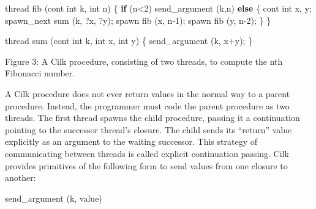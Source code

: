 \documentclass[
]{article}
\newenvironment{Shaded}{}{}
\newcommand{\ControlFlowTok}[1]{\textcolor[rgb]{0.00,0.44,0.13}{\textbf{#1}}}
\newcommand{\DataTypeTok}[1]{\textcolor[rgb]{0.56,0.13,0.00}{#1}}
\newcommand{\DecValTok}[1]{\textcolor[rgb]{0.25,0.63,0.44}{#1}}
\newcommand{\NormalTok}[1]{#1}
\newcommand{\OperatorTok}[1]{\textcolor[rgb]{0.40,0.40,0.40}{#1}}
\begin{document}
\begin{Shaded}
\begin{Highlighting}[]
\NormalTok{thread fib }\OperatorTok{(}\NormalTok{cont }\DataTypeTok{int}\NormalTok{ k}\OperatorTok{,} \DataTypeTok{int}\NormalTok{ n}\OperatorTok{)}
\OperatorTok{\{}    \ControlFlowTok{if} \OperatorTok{(}\NormalTok{n}\OperatorTok{\textless{}}\DecValTok{2}\OperatorTok{)}
\NormalTok{    send\_argument }\OperatorTok{(}\NormalTok{k}\OperatorTok{,}\NormalTok{n}\OperatorTok{)}
    \ControlFlowTok{else}
    \OperatorTok{\{}\NormalTok{    cont }\DataTypeTok{int}\NormalTok{ x}\OperatorTok{,}\NormalTok{ y}\OperatorTok{;}
\NormalTok{    spawn\_next sum }\OperatorTok{(}\NormalTok{k}\OperatorTok{,} \OperatorTok{?}\NormalTok{x}\OperatorTok{,} \OperatorTok{?}\NormalTok{y}\OperatorTok{);}
\NormalTok{    spawn fib }\OperatorTok{(}\NormalTok{x}\OperatorTok{,}\NormalTok{ n}\OperatorTok{{-}}\DecValTok{1}\OperatorTok{);}
\NormalTok{    spawn fib }\OperatorTok{(}\NormalTok{y}\OperatorTok{,}\NormalTok{ n}\OperatorTok{{-}}\DecValTok{2}\OperatorTok{);}
    \OperatorTok{\}}
\OperatorTok{\}}

\NormalTok{thread sum }\OperatorTok{(}\NormalTok{cont }\DataTypeTok{int}\NormalTok{ k}\OperatorTok{,} \DataTypeTok{int}\NormalTok{ x}\OperatorTok{,} \DataTypeTok{int}\NormalTok{ y}\OperatorTok{)}
\OperatorTok{\{}\NormalTok{    send\_argument }\OperatorTok{(}\NormalTok{k}\OperatorTok{,}\NormalTok{ x}\OperatorTok{+}\NormalTok{y}\OperatorTok{);}
\OperatorTok{\}} 
\end{Highlighting}
\end{Shaded}

Figure 3: A Cilk procedure, consisting of two threads, to compute the
nth Fibonacci number.

A Cilk procedure does not ever return values in the normal way to a
parent procedure. Instead, the programmer must code the parent procedure
as two threads. The first thread spawns the child procedure, passing it
a continuation pointing to the successor thread's closure. The child
sends its ``return'' value explicitly as an argument to the waiting
successor. This strategy of communicating between threads is called
explicit continuation passing. Cilk provides primitives of the following
form to send values from one closure to another:

\begin{Shaded}
\begin{Highlighting}[]
\NormalTok{send\_argument (k, value) }
\end{Highlighting}
\end{Shaded}
\end{document}
